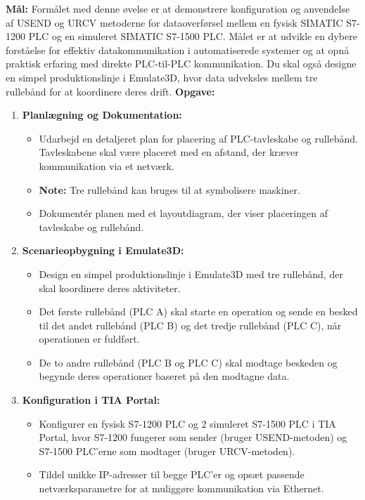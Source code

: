 \textbf{Mål:} Formålet med denne øvelse er at demonstrere konfiguration og anvendelse af USEND og URCV metoderne for dataoverførsel mellem en fysisk SIMATIC S7-1200 PLC og en simuleret SIMATIC S7-1500 PLC. Målet er at udvikle en dybere forståelse for effektiv datakommunikation i automatiserede systemer og at opnå praktisk erfaring med direkte PLC-til-PLC kommunikation. Du skal også designe en simpel produktionslinje i Emulate3D, hvor data udveksles mellem tre rullebånd for at koordinere deres drift.
\newline\newline
\noindent\textbf{Opgave:}
\begin{enumerate}
	\item \textbf{Planlægning og Dokumentation:}
	\begin{itemize}
		\item Udarbejd en detaljeret plan for placering af PLC-tavleskabe og rullebånd. Tavleskabene skal være placeret med en afstand, der kræver kommunikation via et netværk.
		\item \textbf{Note:} Tre rullebånd kan bruges til at symbolisere maskiner.
		\item Dokumentér planen med et layoutdiagram, der viser placeringen af tavleskabe og rullebånd.
	\end{itemize}
	\item \textbf{Scenarieopbygning i Emulate3D:}
	\begin{itemize}
		\item Design en simpel produktionslinje i Emulate3D med tre rullebånd, der skal koordinere deres aktiviteter.
		\item Det første rullebånd (PLC A) skal starte en operation og sende en besked til det andet rullebånd (PLC B) og det tredje rullebånd (PLC C), når operationen er fuldført.
		\item De to andre rullebånd (PLC B og PLC C) skal modtage beskeden og begynde deres operationer baseret på den modtagne data.
	\end{itemize}
	\item \textbf{Konfiguration i TIA Portal:}
	\begin{itemize}
		\item Konfigurer en fysisk S7-1200 PLC og 2 simuleret S7-1500 PLC i TIA Portal, hvor S7-1200 fungerer som sender (bruger USEND-metoden) og S7-1500 PLC'erne som modtager (bruger URCV-metoden).
		\item Tildel unikke IP-adresser til begge PLC'er og opsæt passende netværksparametre for at muliggøre kommunikation via Ethernet.

\end{itemize}
\end{enumerate}
